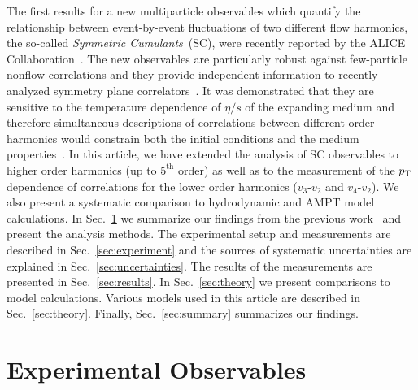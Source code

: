 The first results for a new multiparticle observables which quantify the relationship between event-by-event fluctuations of two different flow harmonics, the so-called \textit{Symmetric Cumulants}~(SC), were recently reported by the ALICE Collaboration~\cite{ALICE:2016kpq}.
The new observables are particularly robust against few-particle nonflow correlations and they provide independent information to recently analyzed symmetry plane correlators~\cite{Aad:2014fla}. 
It was demonstrated that they are sensitive to the temperature dependence of $\eta/s$ of the expanding medium and therefore simultaneous descriptions of correlations between different order harmonics would constrain both the initial conditions and the medium properties~\cite{ALICE:2016kpq,Zhu:2016puf}.
In this article, we have extended the analysis of SC observables to higher order harmonics (up to $5^{\mathrm{th}}$ order) as well as to the measurement of the $p_{\rm T}$ dependence of correlations for the lower order harmonics ($v_3$-$v_2$ and $v_4$-$v_2$).  We also present a systematic comparison to hydrodynamic and AMPT model calculations.
In Sec.~\ref{sec:method} we summarize our findings from the previous work~\cite{ALICE:2016kpq} and present the analysis methods. The experimental setup and measurements are described in Sec.~\ref{sec:experiment} and the sources of systematic uncertainties are explained in Sec.~\ref{sec:uncertainties}. The results of the measurements are presented in Sec.~\ref{sec:results}. 
 In Sec.~\ref{sec:theory} we present comparisons to model calculations. Various models used in this article are described in Sec.~\ref{sec:theory}. Finally, Sec.~\ref{sec:summary} summarizes our findings.
 
 

\section{Experimental Observables}
\label{sec:method}

